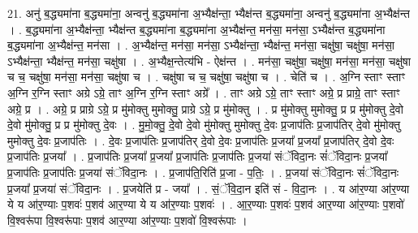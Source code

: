\documentclass[17pt]{extarticle}
\begin{document}
21. अनु॑ ब॒द्ध्यमा॑ना ब॒द्ध्यमा॑ना॒ अन्वनु॑ ब॒द्ध्यमा॑ना अ॒भ्यैक्ष॑न्ता॒ भ्यैक्ष॑न्त ब॒द्ध्यमा॑ना॒ अन्वनु॑ ब॒द्ध्यमा॑ना अ॒भ्यैक्ष॑न्त । . ब॒द्ध्यमा॑ना अ॒भ्यैक्ष॑न्ता॒ भ्यैक्ष॑न्त ब॒द्ध्यमा॑ना ब॒द्ध्यमा॑ना अ॒भ्यैक्ष॑न्त॒ मन॑सा॒ मन॑सा॒ ऽभ्यैक्ष॑न्त ब॒द्ध्यमा॑ना ब॒द्ध्यमा॑ना अ॒भ्यैक्ष॑न्त॒ मन॑सा । . अ॒भ्यैक्ष॑न्त॒ मन॑सा॒ मन॑सा॒ ऽभ्यैक्ष॑न्ता॒ भ्यैक्ष॑न्त॒ मन॑सा॒ चक्षु॑षा॒ चक्षु॑षा॒ मन॑सा॒ ऽभ्यैक्ष॑न्ता॒ भ्यैक्ष॑न्त॒ मन॑सा॒ चक्षु॑षा । . अ॒भ्यैक्ष॒न्तेत्य॑भि - ऐक्ष॑न्त । . मन॑सा॒ चक्षु॑षा॒ चक्षु॑षा॒ मन॑सा॒ मन॑सा॒ चक्षु॑षा च च॒ चक्षु॑षा॒ मन॑सा॒ मन॑सा॒ चक्षु॑षा च । . चक्षु॑षा च च॒ चक्षु॑षा॒ चक्षु॑षा च । . चेति॑ च । . अ॒ग्नि स्ताꣳ स्ताꣳ अ॒ग्नि र॒ग्नि स्ताꣳ अग्रे ऽग्रे॒ ताꣳ अ॒ग्नि र॒ग्नि स्ताꣳ अग्रे᳚ । . ताꣳ अग्रे ऽग्रे॒ ताꣳ स्ताꣳ अग्रे॒ प्र प्राग्रे॒ ताꣳ स्ताꣳ अग्रे॒ प्र । . अग्रे॒ प्र प्राग्रे ऽग्रे॒ प्र मु॑मोक्तु मुमोक्तु॒ प्राग्रे ऽग्रे॒ प्र मु॑मोक्तु । . प्र मु॑मोक्तु मुमोक्तु॒ प्र प्र मु॑मोक्तु दे॒वो दे॒वो मु॑मोक्तु॒ प्र प्र मु॑मोक्तु दे॒वः । . मु॒मो॒क्तु॒ दे॒वो दे॒वो मु॑मोक्तु मुमोक्तु दे॒वः प्र॒जाप॑तिः प्र॒जाप॑तिर् दे॒वो मु॑मोक्तु मुमोक्तु दे॒वः प्र॒जाप॑तिः । . दे॒वः प्र॒जाप॑तिः प्र॒जाप॑तिर् दे॒वो दे॒वः प्र॒जाप॑तिः प्र॒जया᳚ प्र॒जया᳚ प्र॒जाप॑तिर् दे॒वो दे॒वः प्र॒जाप॑तिः प्र॒जया᳚ । . प्र॒जाप॑तिः प्र॒जया᳚ प्र॒जया᳚ प्र॒जाप॑तिः प्र॒जाप॑तिः प्र॒जया॑ संॅविदा॒नः सं॑ॅविदा॒नः प्र॒जया᳚ प्र॒जाप॑तिः प्र॒जाप॑तिः प्र॒जया॑ संॅविदा॒नः । . प्र॒जाप॑ति॒रिति॑ प्र॒जा - प॒तिः॒ । . प्र॒जया॑ संॅविदा॒नः सं॑ॅविदा॒नः प्र॒जया᳚ प्र॒जया॑ संॅविदा॒नः । . प्र॒जयेति॑ प्र - जया᳚ । . सं॒ॅवि॒दा॒न इति॑ सं - वि॒दा॒नः । . य आ॑र॒ण्या आ॑र॒ण्या ये य आ॑र॒ण्याः प॒शवः॑ प॒शव॑ आर॒ण्या ये य आ॑र॒ण्याः प॒शवः॑ । . आ॒र॒ण्याः प॒शवः॑ प॒शव॑ आर॒ण्या आ॑र॒ण्याः प॒शवो॑ वि॒श्वरू॑पा वि॒श्वरू॑पाः प॒शव॑ आर॒ण्या आ॑र॒ण्याः प॒शवो॑ वि॒श्वरू॑पाः । \newline
\end{document}
